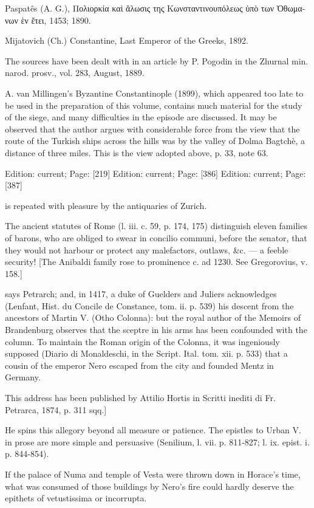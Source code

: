 Paspatês (A. G.), \textgreek{Πολιορκία κα\texthebrew{ὶ ἅ}λωσις της Κωνσταντινουπόλεως \texthebrew{ὑ}π\texthebrew{ὸ} των \texthebrew{Ὀ}θωμανων \texthebrew{ὲ}ν \texthebrew{ἔ}τει}, 1453; 1890.

Mijatovich (Ch.) Constantine, Last Emperor of the Greeks, 1892.

The sources have been dealt with in an article by P. Pogodin in the Zhurnal min. narod. prosv., vol. 283, August, 1889.

A. van Millingen\texthebrew{}’s Byzantine Constantinople (1899), which appeared too late to be used in the preparation of this volume, contains much material for the study of the siege, and many difficulties in the episode are discussed. It may be observed that the author argues with considerable force from the view that the route of the Turkish ships across the hills was by the valley of Dolma Bagtchè, a distance of three miles. This is the view adopted above, p. 33, note 63.

Edition: current; Page: [219]
Edition: current; Page: [386]
Edition: current; Page: [387]

is repeated with pleasure by the antiquaries of Zurich.

The ancient statutes of Rome (l. iii. c. 59, p. 174, 175) distinguish eleven families of barons, who are obliged to swear in concilio communi, before the senator, that they would not harbour or protect any malefactors, outlaws, \&c. \texthebrew{—} a feeble security! [The Anibaldi family rose to prominence c. ad 1230. See Gregorovius, v. 158.]

says Petrarch; and, in 1417, a duke of Guelders and Juliers acknowledges (Lenfant, Hist. du Concile de Constance, tom. ii. p. 539) his descent from the ancestors of Martin V. (Otho Colonna): but the royal author of the Memoirs of Brandenburg observes that the sceptre in his arms has been confounded with the column. To maintain the Roman origin of the Colonna, it was ingeniously supposed (Diario di Monaldeschi, in the Script. Ital. tom. xii. p. 533) that a cousin of the emperor Nero escaped from the city and founded Mentz in Germany.

This address has been published by Attilio Hortis in Scritti inediti di Fr. Petrarca, 1874, p. 311 sqq.]

He spins this allegory beyond all measure or patience. The epistles to Urban V. in prose are more simple and persuasive (Senilium, l. vii. p. 811-827; l. ix. epist. i. p. 844-854).

If the palace of Numa and temple of Vesta were thrown down in Horace\texthebrew{}’s time, what was consumed of those buildings by Nero\texthebrew{}’s fire could hardly deserve the epithets of vetustissima or incorrupta.
